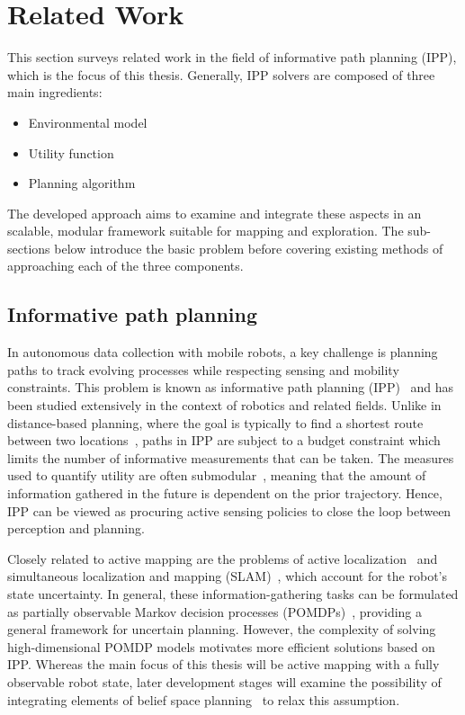 \section{Related Work}
\label{S:related_work}

This section surveys related work in the field of informative path planning (IPP), which is the focus of 
this thesis. Generally, IPP solvers are composed of three main ingredients: 

\begin{itemize}
 \item Environmental model
 \item Utility function
 \item Planning algorithm
\end{itemize}

The developed approach aims to examine and integrate these aspects in an scalable, modular framework 
suitable for mapping and exploration. The sub-sections below introduce the basic problem before covering 
existing methods of approaching each of the three components.

\subsection{Informative path planning}

In autonomous data collection with mobile robots, a key challenge is planning paths to track evolving 
processes while respecting sensing and mobility constraints. This problem is known as informative 
path planning (IPP)~\cite{Singh2009} and has been studied extensively in the context of robotics and 
related fields. Unlike in distance-based planning, where the goal is typically to find a shortest 
route between two locations~\cite{Dijkstra1959}, paths in IPP are subject to a budget constraint 
which limits the number of informative measurements that can be taken. The measures used to quantify 
utility are often submodular~\cite{Krause2011}, meaning that the amount of information gathered in the 
future is dependent on the prior trajectory. Hence, IPP can be viewed as procuring active 
sensing policies to close the loop between perception and planning.

Closely related to active mapping are the problems of active localization~\cite{Thrun1999} and simultaneous 
localization and mapping (SLAM)~\cite{Mu2015, Indelman2014, Bry2011}, which account for the robot's 
state uncertainty. In general, these information-gathering tasks can be formulated as partially observable 
Markov decision processes (POMDPs)~\cite{Kaelbling1998}, providing a general framework for uncertain 
planning. However, the complexity of solving high-dimensional POMDP models motivates more 
efficient solutions based on IPP. Whereas the main focus of this thesis will be active mapping with a 
fully observable robot state, later development stages will examine the possibility of integrating 
elements of belief space planning~\cite{Indelman2014, Indelman2015a} to relax this assumption.


